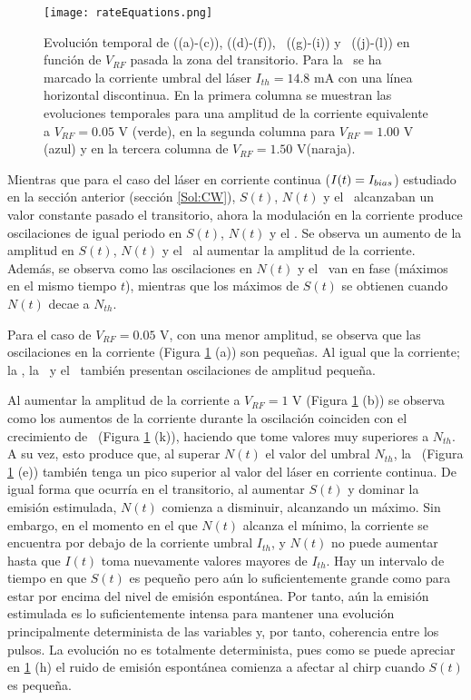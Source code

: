 			\begin{figure}[H]
				\centering
				\texttt{[image: rateEquations.png]}
				\caption{\label{Img:rateEquations}Evolución temporal de \I ((a)-(c)), \s ((d)-(f)), \n\ ((g)-(i)) y \chirp\ ((j)-(l)) en funci\'on de $V_{RF}$ pasada la zona del transitorio. Para la \I\ se ha marcado la corriente umbral del l\'aser $I_{th} = 14.8$ mA con una l\'inea horizontal discontinua. En la primera columna se muestran las evoluciones temporales para una amplitud de la corriente equivalente a $V_{RF} = 0.05$ V (verde), en la segunda columna para $V_{RF} = 1.00$ V (azul) y en la tercera columna de $V_{RF} = 1.50$ V(naraja).}	
			\end{figure}

		Mientras que para el caso del l\'aser en corriente continua ($I(t) = I_{bias}$) estudiado en la secci\'on anterior (secci\'on \ref{Sol:CW}), $S(t)$, $N(t)$ y el \chirp\ alcanzaban un valor constante pasado el transitorio, ahora la modulación en la corriente produce oscilaciones de igual periodo en $S(t)$, $N(t)$ y el \chirp. Se observa un aumento de la amplitud en $S(t)$, $N(t)$ y el \chirp\ al aumentar la amplitud de la corriente. Adem\'as, se observa como las oscilaciones en $N(t)$ y el \chirp\ van en fase (m\'aximos en el mismo tiempo $t$), mientras que los m\'aximos de $S(t)$ se obtienen cuando $N(t)$ decae a $N_{th}$.
			
		Para el caso de $V_{RF} = 0.05$ V, con una menor amplitud, se observa que las oscilaciones en la corriente (Figura \ref{Img:rateEquations} (a)) son pequeñas. Al igual que la corriente; la \s, la \n\ y el \chirp\ tambi\'en presentan oscilaciones de amplitud pequeña.

		Al aumentar la amplitud de la corriente a $V_{RF} = 1$ V (Figura \ref{Img:rateEquations} (b)) se observa como los aumentos de la corriente durante la oscilaci\'on coinciden con el crecimiento de \n\ (Figura \ref{Img:rateEquations} (k)), haciendo que tome valores muy superiores a $N_{th}$. A su vez, esto produce que, al superar $N(t)$ el valor del umbral $N_{th}$, la \s\ (Figura \ref{Img:rateEquations} (e)) tambi\'en tenga un pico superior al valor del l\'aser en corriente continua. De igual forma que ocurría en el transitorio, al aumentar $S(t)$ y dominar la emisi\'on estimulada, $N(t)$ comienza a disminuir, alcanzando un m\'aximo. Sin embargo, en el momento en el que $N(t)$ alcanza el m\'inimo, la corriente se encuentra por debajo de la corriente umbral $I_{th}$, y $N(t)$ no puede aumentar hasta que $I(t)$ toma nuevamente valores mayores de $I_{th}$. Hay un intervalo de tiempo en que $S(t)$ es pequeño pero a\'un lo suficientemente grande como para estar por encima del nivel de emisi\'on espont\'anea. Por tanto, a\'un la emisi\'on estimulada es lo suficientemente intensa para mantener una evoluci\'on principalmente determinista de las variables y, por tanto, coherencia entre los pulsos. La evoluci\'on no es totalmente determinista, pues como se puede apreciar en \ref{Img:rateEquations} (h) el ruido de emisi\'on espont\'anea comienza a afectar al chirp cuando $S(t)$ es pequeña.
		
